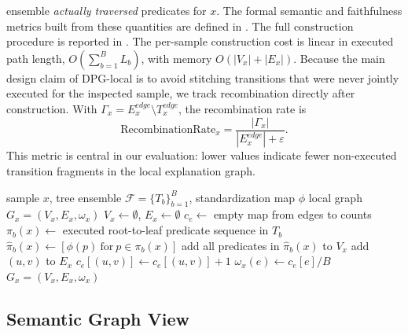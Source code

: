 \documentclass[runningheads]{llncs}
\begin{document}
ensemble \emph{actually traversed} predicates for $x$. 
The formal semantic and faithfulness metrics built from these quantities are defined in .
The full construction procedure is reported in .
The per-sample construction cost is linear in executed path length,
$O(\sum_{b=1}^{B}L_b)$, with memory $O(|V_x|+|E_x|)$. Because the main design claim of DPG-local is to avoid stitching transitions
that were never jointly executed for the inspected sample, we track
recombination directly after construction. With
$\Gamma_x=E_x^{edge}\setminus T_x^{edge}$, the recombination rate is
\[
\mathrm{RecombinationRate}_x=\frac{|\Gamma_x|}{|E_x^{edge}|+\varepsilon}.
\]
This metric is central in our evaluation: lower values indicate fewer
non-executed transition fragments in the local explanation graph.


\begin{algorithm}[ht!]
\caption{DPG-local construction}
\label{alg:exec-trace-dpg}
\begin{algorithmic}[1]
\Require sample $x$, tree ensemble $\mathcal{F}=\{T_b\}_{b=1}^B$, standardization map $\phi$
\Ensure local graph $G_x=(V_x,E_x,\omega_x)$
\State $V_x \gets \emptyset$, $E_x \gets \emptyset$
\State $c_e \gets$ empty map from edges to counts
  \State $\pi_b(x) \gets$ executed root-to-leaf predicate sequence in $T_b$
  \State $\hat{\pi}_b(x) \gets [\phi(p)\ \text{for}\ p\in\pi_b(x)]$
  \State add all predicates in $\hat{\pi}_b(x)$ to $V_x$
    \State add $(u,v)$ to $E_x$
    \State $c_e[(u,v)] \gets c_e[(u,v)] + 1$
  \EndFor
\EndFor
{}
  \State $\omega_x(e) \gets c_e[e]/B$
\EndFor
\State \Return $G_x=(V_x,E_x,\omega_x)$
\end{algorithmic}
\end{algorithm}



\subsection{Semantic Graph View} \label{sec:semantic-layer}
\end{document}
